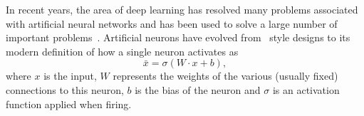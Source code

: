 \documentclass[11pt]{article}
\begin{document}

In recent years, the area of deep learning has resolved many problems associated with artificial neural networks and has been used to solve a large number of important problems~\citep{lecun_deep_2015}.
Artificial neurons have evolved from~\citet{mcculloch_logical_1943} style designs to its modern definition of how a single neuron activates as
\begin{equation}
    \bar{x} = \sigma (W\cdot x+b),
\end{equation}
where $x$ is the input, $W$ represents the weights of the various (usually fixed) connections to this neuron, $b$ is the bias of the neuron and $\sigma$ is an activation function applied when firing.
\end{document}
